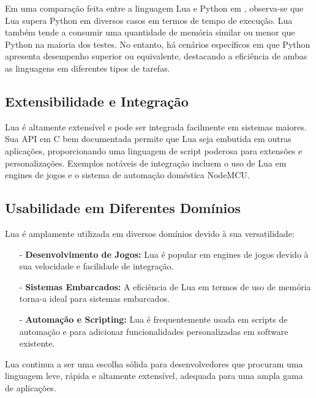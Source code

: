 \documentclass[12pt]{article}
\begin{document}
Em uma comparação feita entre a linguagem Lua e Python em \cite{benchmarks-game}, observa-se que Lua supera Python em diversos casos em termos de tempo de execução. Lua também tende a consumir uma quantidade de memória similar ou menor que Python na maioria dos testes. No entanto, há cenários específicos em que Python apresenta desempenho superior ou equivalente, destacando a eficiência de ambas as linguagens em diferentes tipos de tarefas.

\subsection{Extensibilidade e Integração}
Lua é altamente extensível e pode ser integrada facilmente em sistemas maiores. Sua API em C bem documentada permite que Lua seja embutida em outras aplicações, proporcionando uma linguagem de script poderosa para extensões e personalizações. Exemplos notáveis de integração incluem o uso de Lua em engines de jogos e o sistema de automação doméstica NodeMCU.

\subsection{Usabilidade em Diferentes Domínios}
Lua é amplamente utilizada em diversos domínios devido à sua versatilidade:

\begin{itemize}
  \item[-] \textbf{Desenvolvimento de Jogos:} Lua é popular em engines de jogos devido à sua velocidade e facilidade de integração.
  \item[-] \textbf{Sistemas Embarcados:} A eficiência de Lua em termos de uso de memória torna-a ideal para sistemas embarcados.
  \item[-] \textbf{Automação e Scripting:} Lua é frequentemente usada em scripts de automação e para adicionar funcionalidades personalizadas em software existente.
\end{itemize}

Lua continua a ser uma escolha sólida para desenvolvedores que procuram uma linguagem leve, rápida e altamente extensível, adequada para uma ampla gama de aplicações.
\end{document}
